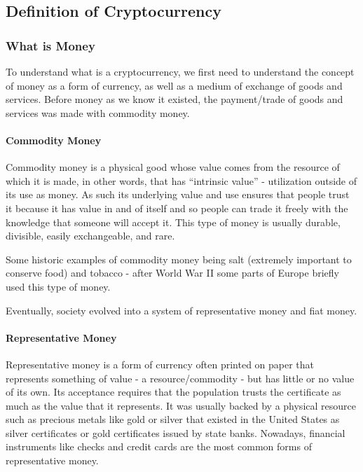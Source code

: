 \documentclass{article}
\newcommand\tab[1][1cm]{\hspace*{#1}}
\begin{document}
\subsection{Definition of Cryptocurrency}

\subsubsection{What is Money}

\tab To understand what is a cryptocurrency, we first need to understand the concept of money as a form of currency, as well as a medium of exchange of goods and services. Before money as we know it existed, the payment/trade of goods and services was made with commodity money.

\paragraph{Commodity Money}
 
\tab Commodity money is a physical good whose value comes from the resource of which it is made, in other words, that has “intrinsic value” - utilization outside of its use as money. As such its underlying value and use ensures that people trust it because it has value in and of itself and so people can trade it freely with the knowledge that someone will accept it. This type of money is usually durable, divisible, easily exchangeable, and rare.

Some historic examples of commodity money being salt (extremely important to conserve food) and tobacco - after World War II some parts of Europe briefly used this type of money.

Eventually, society evolved into a system of representative money and fiat money.

\paragraph{Representative Money}

\tab Representative money is a form of currency often printed on paper that represents something of value - a resource/commodity - but has little or no value of its own. Its acceptance requires that the population trusts the certificate as much as the value that it represents. It was usually backed by a physical resource such as precious metals like gold or silver that existed in the United States as silver certificates or gold certificates issued by state banks. Nowadays, financial instruments like checks and credit cards are the most common forms of representative money.
\end{document}
